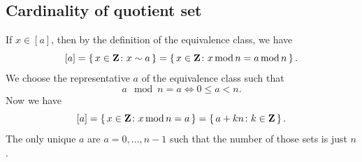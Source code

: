 \documentclass[11pt, english, fleqn, DIV=15, headinclude, BCOR=1cm]{scrartcl}
\begin{document}
\subsection{Cardinality of quotient set}

If $x \in [a]$, then by the definition of the equivalence class, we have
\[
    [a] = \set{x \in \ensuremath{\mathbf Z}\colon x \sim a}
    = \set{x \in \ensuremath{\mathbf Z}\colon x \operatorname{mod}n = a \operatorname{mod}n}.
\]
We choose the representative $a$ of the equivalence class such that
\[
    a \mod n = a
    \iff
    0 \leq a < n.
\]
Now we have
\[
    [a]
    = \set{x \in \ensuremath{\mathbf Z}\colon x \operatorname{mod}n = a}
    = \set{a + kn \colon k \in \ensuremath{\mathbf Z}}.
\]
The only unique $a$ are $a = 0, \ldots, n-1$ such that the number of those sets
is just $n$.
\end{document}
